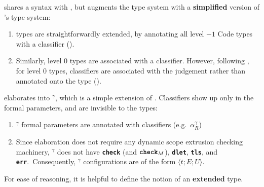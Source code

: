 \recLang{} shares a syntax with \sourceLang{}, but augments the \sourceLang{} type system with a \textbf{simplified} version of \citeauthor{isoda-24}'s type system:

\begin{enumerate} 
  \item \sourceLang{} types are straightforwardly extended, by annotating all level $-1$ \textsf{Code} types with a classifier ().
  \item Similarly, level $0$ types are associated with a classifier. However, following \citet{isoda-24}, for level $0$ types, classifiers are associated with the judgement rather than annotated onto the type (). 
\end{enumerate}
\newcommand{\recCoreLang}{\coreLang{}$^\gamma$}
\recLang{} elaborates into \recCoreLang{}, which is a simple extension of \coreLang{}. Classifiers show up only in the formal parameters, and are invisible to the types:
\begin{enumerate}
  \item \recCoreLang{} formal parameters are annotated with classifiers (e.g.\ $\alpha_R^{\gamma}$)
  \item Since elaboration does not require any dynamic scope extrusion checking machinery, \recCoreLang{} does not have \textbf{\texttt{check}} (and $\textbf{\texttt{check}}_M$), \textbf{\texttt{dlet}}, \textbf{\texttt{tls}}, and \textbf{\texttt{err}}.\ Consequently, \recCoreLang{} configurations are of the form $\langle t;E;U\rangle$.
\end{enumerate}

For ease of reasoning, it is helpful to define the notion of an \textbf{extended} \recLang{} type.

